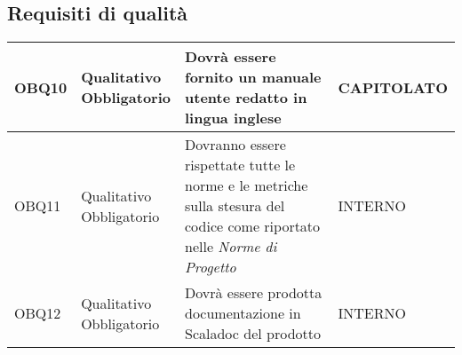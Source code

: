 \documentclass{scalatekids-article}
\begin{document}
\subsection{Requisiti di qualità}
\begin{longtable}[H]{|l|p{2cm}|p{6cm}|p{4cm}|}
\hline
OBQ10 & \multiLineCell{Qualitativo\\Obbligatorio} & Dovrà essere fornito un manuale utente redatto in lingua inglese & \multiLineCell{CAPITOLATO\\}\\
\hline
OBQ11 & \multiLineCell{Qualitativo\\Obbligatorio} & Dovranno essere rispettate tutte le norme e le metriche sulla stesura del codice come riportato nelle \textit{Norme di Progetto} & \multiLineCell{INTERNO\\}\\
\hline
OBQ12 & \multiLineCell{Qualitativo\\Obbligatorio} & Dovrà essere prodotta documentazione in Scaladoc del prodotto & \multiLineCell{INTERNO\\}\\
\hline
\end{longtable}
\end{document}
